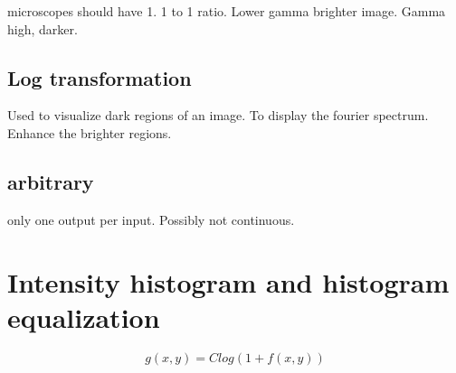 \documentclass[a4paper]{article}
\begin{document}
microscopes should have 1. 1 to 1 ratio. Lower gamma brighter image. Gamma high, darker. 

\subsection{Log transformation}
Used to visualize dark regions of an image. To display the fourier spectrum. Enhance the brighter regions. 

\subsection{arbitrary}
only one output per input. Possibly not continuous.


\section{Intensity histogram and histogram equalization}



\begin{equation}
g(x,y) = Clog(1 + f(x,y))
\end{equation}



\end{document}
